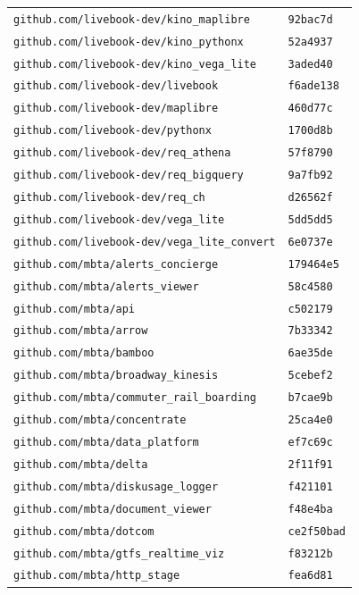 \begin{longtable}{@{}p{} l@{}}
\texttt{github.com/livebook-dev/kino\_maplibre} & \texttt{92bac7d} \\
\texttt{github.com/livebook-dev/kino\_pythonx} & \texttt{52a4937} \\
\texttt{github.com/livebook-dev/kino\_vega\_lite} & \texttt{3aded40} \\
\texttt{github.com/livebook-dev/livebook} & \texttt{f6ade138} \\
\texttt{github.com/livebook-dev/maplibre} & \texttt{460d77c} \\
\texttt{github.com/livebook-dev/pythonx} & \texttt{1700d8b} \\
\texttt{github.com/livebook-dev/req\_athena} & \texttt{57f8790} \\
\texttt{github.com/livebook-dev/req\_bigquery} & \texttt{9a7fb92} \\
\texttt{github.com/livebook-dev/req\_ch} & \texttt{d26562f} \\
\texttt{github.com/livebook-dev/vega\_lite} & \texttt{5dd5dd5} \\
\texttt{github.com/livebook-dev/vega\_lite\_convert} & \texttt{6e0737e} \\
\texttt{github.com/mbta/alerts\_concierge} & \texttt{179464e5} \\
\texttt{github.com/mbta/alerts\_viewer} & \texttt{58c4580} \\
\texttt{github.com/mbta/api} & \texttt{c502179} \\
\texttt{github.com/mbta/arrow} & \texttt{7b33342} \\
\texttt{github.com/mbta/bamboo} & \texttt{6ae35de} \\
\texttt{github.com/mbta/broadway\_kinesis} & \texttt{5cebef2} \\
\texttt{github.com/mbta/commuter\_rail\_boarding} & \texttt{b7cae9b} \\
\texttt{github.com/mbta/concentrate} & \texttt{25ca4e0} \\
\texttt{github.com/mbta/data\_platform} & \texttt{ef7c69c} \\
\texttt{github.com/mbta/delta} & \texttt{2f11f91} \\
\texttt{github.com/mbta/diskusage\_logger} & \texttt{f421101} \\
\texttt{github.com/mbta/document\_viewer} & \texttt{f48e4ba} \\
\texttt{github.com/mbta/dotcom} & \texttt{ce2f50bad} \\
\texttt{github.com/mbta/gtfs\_realtime\_viz} & \texttt{f83212b} \\
\texttt{github.com/mbta/http\_stage} & \texttt{fea6d81} \\

\end{longtable}
